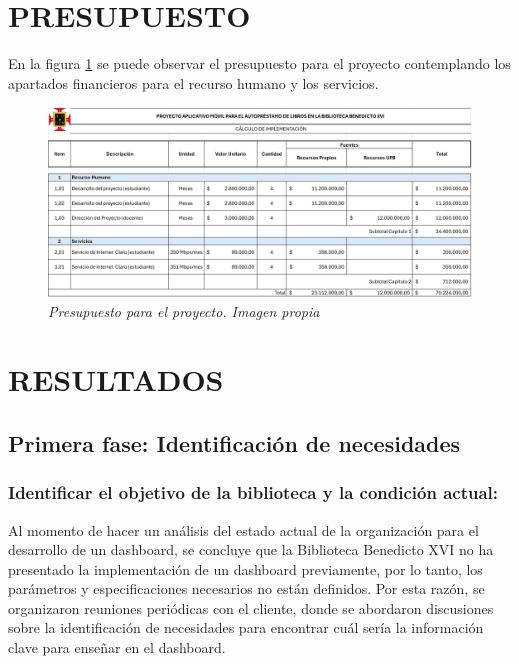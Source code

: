 \documentclass[spanish]{ieee_upb}
\begin{document}
\newpage
\section{\label{sec:propiedadintelectual}PRESUPUESTO}
En la figura \ref{fig:presupuesto} se puede observar el presupuesto para el proyecto contemplando los apartados financieros para el recurso humano y los servicios.

\vspace{1cm}
\begin{figure}[htpb] 
	\centering
	\includegraphics[width=0.9\linewidth]{img/presupuesto-inicial.png}
	\vspace{-1mm}
	\caption[Presupuesto para el proyecto.]{\textit{Presupuesto para el proyecto. Imagen propia}}
	\label{fig:presupuesto} 
\end{figure}




\newpage
\section{RESULTADOS}


\subsection{Primera fase: Identificación de necesidades}

\subsubsection{Identificar el objetivo de la biblioteca y la condición actual:}
Al momento de hacer un análisis del estado actual de la organización para el desarrollo de un dashboard, se concluye que la Biblioteca Benedicto XVI no ha presentado la implementación de un dashboard previamente, por lo tanto, los parámetros y especificaciones necesarios no están definidos. Por esta razón, se organizaron reuniones periódicas con el cliente, donde se abordaron discusiones sobre la identificación de necesidades para encontrar cuál sería la información clave para enseñar en el dashboard.
\end{document}

